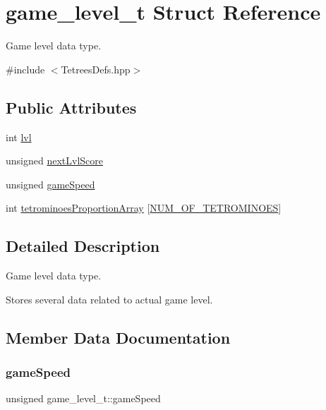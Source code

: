 \hypertarget{structgame__level__t}{}\section{game\+\_\+level\+\_\+t Struct Reference}
\label{structgame__level__t}


Game level data type.  




{\ttfamily \#include $<$Tetrees\+Defs.\+hpp$>$}

\subsection*{Public Attributes}
\begin{DoxyCompactItemize}
\item 
int \hyperlink{structgame__level__t_ab80383a9c51e3ad25cda4df0a7df8df2}{lvl}
\item 
unsigned \hyperlink{structgame__level__t_a9f5f86c9c90bebdd20950d74bf2dd450}{next\+Lvl\+Score}
\item 
unsigned \hyperlink{structgame__level__t_a2501f9b624ec9cf7788649127e111a33}{game\+Speed}
\item 
int \hyperlink{structgame__level__t_abcef20ad8f4df7d270a4d5111ac8d85a}{tetrominoes\+Proportion\+Array} \mbox{[}\hyperlink{TetreesDefs_8hpp_a69fa4aa1afe74f7f9ec42bf1e07ddf28}{N\+U\+M\+\_\+\+O\+F\+\_\+\+T\+E\+T\+R\+O\+M\+I\+N\+O\+ES}\mbox{]}
\end{DoxyCompactItemize}


\subsection{Detailed Description}
Game level data type. 

Stores several data related to actual game level. 

\subsection{Member Data Documentation}
\mbox{\label{structgame__level__t_a2501f9b624ec9cf7788649127e111a33}} 
\subsubsection{\texorpdfstring{game\+Speed}{gameSpeed}}
{\footnotesize\ttfamily unsigned game\+\_\+level\+\_\+t\+::game\+Speed}

